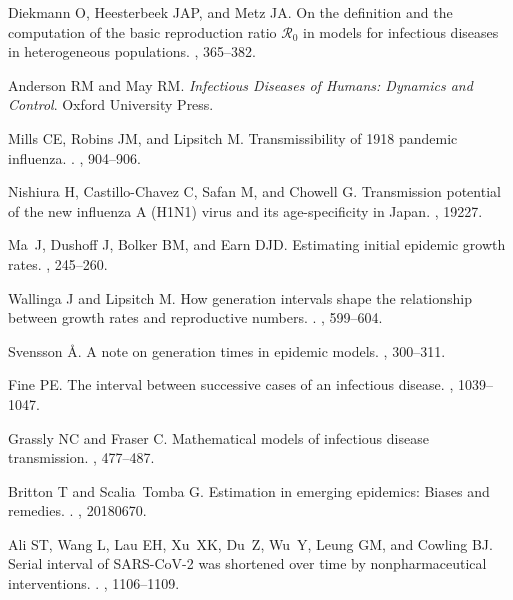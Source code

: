 \documentclass[12pt]{article}
\begin{document}
\begin{thebibliography}{10}
Diekmann O, Heesterbeek JAP, and Metz JA.
 On the definition and the computation of the basic reproduction
  ratio $\mathcal{R}_0$ in models for infectious diseases in heterogeneous
  populations.
, 365--382.

Anderson RM and May RM.
 {\em {Infectious Diseases of Humans: Dynamics and Control}}.
\newblock Oxford University Press.

Mills CE, Robins JM, and Lipsitch M.
 Transmissibility of 1918 pandemic influenza.
.
, 904--906.

Nishiura H, Castillo-Chavez C, Safan M, and Chowell G.
 {Transmission potential of the new influenza A (H1N1) virus and
  its age-specificity in Japan}.
, 19227.

Ma~J, Dushoff J, Bolker BM, and Earn DJD.
 Estimating initial epidemic growth rates.
, 245--260.

Wallinga J and Lipsitch M.
 How generation intervals shape the relationship between growth
  rates and reproductive numbers.
.
, 599--604.

Svensson {\AA}.
 A note on generation times in epidemic models.
, 300--311.

Fine PE.
 The interval between successive cases of an infectious disease.
, 1039--1047.

Grassly NC and Fraser C.
 Mathematical models of infectious disease transmission.
, 477--487.

Britton T and Scalia~Tomba G.
 {Estimation in emerging epidemics: Biases and remedies}.
.
, 20180670.

Ali ST, Wang L, Lau EH, Xu~XK, Du~Z, Wu~Y, Leung GM, and Cowling BJ.
 {Serial interval of SARS-CoV-2 was shortened over time by
  nonpharmaceutical interventions}.
.
, 1106--1109.


\end{thebibliography}
\end{document}
